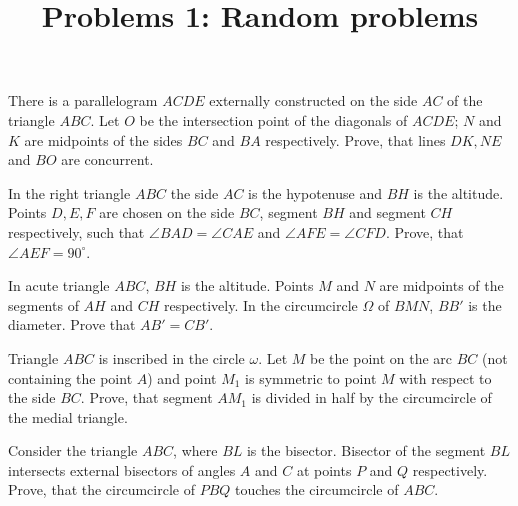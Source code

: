 \documentclass[14pt]{extarticle}
\begin{document}
    \title{Problems 1: Random problems}

    \begin{problems}

        \item There is a parallelogram \(ACDE\) externally constructed on the
        side \(AC\) of the triangle \(ABC\). Let \(O\) be the intersection
        point of the diagonals of \(ACDE\); \(N\) and \(K\) are midpoints of
        the sides \(BC\) and \(BA\) respectively. Prove, that lines \(DK, NE\) 
        and \(BO\) are concurrent. 

        \item In the right triangle \(ABC\) the side \(AC\) is the hypotenuse
        and \(BH\) is the altitude. Points \(D, E, F\) are chosen on the side
        \(BC\), segment \(BH\) and segment \(CH\) respectively, such that
        \(\angle BAD = \angle CAE\) and \(\angle AFE = \angle CFD\).  Prove,
        that \(\angle AEF = 90^{\circ}\).


        \item In acute triangle \(ABC\), \(BH\) is the altitude. Points \(M\)
        and \(N\) are midpoints of the segments of \(AH\) and \(CH\)
        respectively. In the circumcircle \(\Omega\) of \(BMN\), \(BB'\) is
        the diameter. Prove that \(AB' = CB'\).
        
        \item Triangle \(ABC\) is inscribed in the circle \(\omega\). Let \(M\) be
        the point on the arc \(BC\) (not containing the point \(A\)) and point
        \(M_1\) is symmetric to point \(M\) with respect to the side \(BC\).
        Prove, that segment \(AM_1\) is divided in half by the circumcircle of
        the medial triangle.

        \item Consider the triangle \(ABC\), where \(BL\) is the bisector.
        Bisector of the segment \(BL\) intersects external bisectors of angles
        \(A\) and \(C\) at points \(P\) and \(Q\) respectively. Prove, that
        the circumcircle of \(PBQ\) touches the circumcircle of \(ABC\).
    \end{problems}
\end{document}
